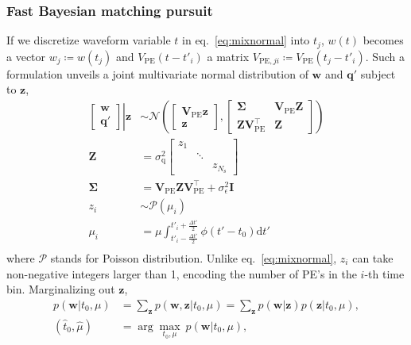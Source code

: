 \subsubsection{Fast Bayesian matching pursuit}
\label{subsec:fbmp}
If we discretize waveform variable $t$ in eq.~\eqref{eq:mixnormal} into $t_j$, $w(t)$ becomes a vector $w_j \coloneqq w(t_j)$ and $V_\mathrm{PE}(t - t'_i)$ a matrix $V_{\mathrm{PE},ji} \coloneqq V_\mathrm{PE}(t_j - t'_i)$.  Such a formulation unveils a joint multivariate normal distribution of $\bm{w}$ and $\bm{q}'$ subject to $\bm{z}$,
\begin{equation}
  \label{eq:mgauss}
  \begin{aligned}
    \left.
      \begin{bmatrix}
        \bm{w} \\
        \bm{q}'
      \end{bmatrix}
    \right\vert\bm{z}
    &\sim \mathcal{N}\left(
      \begin{bmatrix}
        \bm{V}_\mathrm{PE}\bm{z} \\
        \bm{z}
      \end{bmatrix}, 
      \begin{bmatrix}
        \bm{\Sigma} & \bm{V}_\mathrm{PE}\bm{Z} \\
        \bm{Z}\bm{V}_\mathrm{PE}^\intercal & \bm{Z}
      \end{bmatrix}
    \right) \\
    \bm{Z} &= \sigma_\mathrm{q}^2 \begin{bmatrix}
      z_1 & & \\
      & \ddots \\
      && z_{N_\mathrm{s}}
    \end{bmatrix}\\
    \bm{\Sigma} &= \bm{V}_\mathrm{PE}\bm{Z}\bm{V}_\mathrm{PE}^\intercal+\sigma_\epsilon^2\bm{I}\\
    z_i &\sim \mathcal{P}(\mu_i) \\
    \mu_i &= \mu \int_{t'_i-\frac{\Delta t'}{2}}^{t'_i+\frac{\Delta t'}{2}} \phi(t' - t_0)\mathrm{d}t' \\
  \end{aligned}
\end{equation}
where $\mathcal{P}$ stands for Poisson distribution.  Unlike eq.~\eqref{eq:mixnormal}, $z_i$ can take non-negative integers larger than 1, encoding the number of PE's in the $i$-th time bin.  Marginalizing out $\bm{z}$,
\begin{equation}
  \begin{aligned}
    \label{eq:bayesianinter}
    p(\bm{w}|t_0, \mu) & = \sum_{\bm{z}}p(\bm{w}, \bm{z}|t_0,\mu) = \sum_{\bm{z}}p(\bm{w}|\bm{z})p(\bm{z}|t_0,\mu),\\
    \left(\hat{t}_0, \hat{\mu}\right) &= \arg\underset{t_0,\mu}{\max} ~p(\bm{w} | t_0, \mu),
  \end{aligned}
\end{equation}
